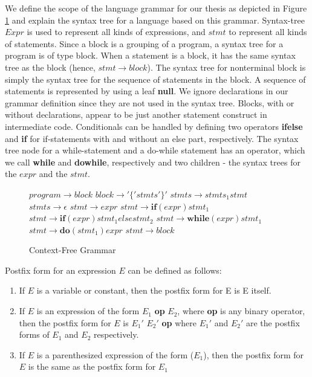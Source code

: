 We define the scope of the language grammar for our thesis as depicted in Figure \ref{fig:grammardef} and explain the syntax tree for a language based on this grammar. Syntax-tree $Expr$ is used to represent all kinds of expressions, and $stmt$ to represent all kinds of statements. Since a block is a grouping of a program, a syntax tree for a program is of type block. When a statement is a block, it has the same syntax tree as the block (hence, $stmt \to block$). The syntax tree for nonterminal block is simply the syntax tree for the sequence of statements in the block. A sequence of statements is represented by using a leaf \textbf{null}. We ignore declarations in our grammar definition since they are not used in the syntax tree. Blocks, with or without declarations, appear to be just another statement construct in intermediate code. Conditionals can be handled by defining two operators \textbf{ifelse} and \textbf{if} for if-statements with and without an else part, respectively. The syntax tree node for a while-statement and a do-while statement has an operator, which we call \textbf{while} and \textbf{dowhile}, respectively and two children - the syntax trees for the $expr$ and the $stmt$. 

\begin{figure}[here]
\begin{algorithmic}
\State $ program \to block$
\State $ block \to '\{' stmts '\}'$
\State $ stmts \to stmts_{1} stmt $
\State $ stmts \to \epsilon$
\State $ stmt \to expr $
\State $ stmt \to \textbf{if} (expr) stmt_{1}$
\State $ stmt \to \textbf{if} (expr) stmt_{1} else stmt_{2} $
\State $ stmt \to \textbf{while} (expr) stmt_{1}$
\State $ stmt \to \textbf{do} (stmt_{1}) expr $
\State $ stmt \to block $
\end{algorithmic}
\caption{Context-Free Grammar}
\label{fig:grammardef}
\end{figure}

\begin{definition}
Postfix form for an expression $E$ can be defined as follows:
\begin{enumerate}
\item If $E$ is a variable or constant, then the postfix form for E is E itself. 
\item If $E$ is an expression of the form $E_{1}$ \textbf{op} $E_{2}$, where \textbf{op} is any binary operator, then the postfix form for $E$ is $E_{1}'$ $E_{2}'$ \textbf{op} where $E_{1}'$ and $E_{2}'$ are the postfix forms of $E_{1}$ and $E_{2}$ respectively. 
\item If $E$ is a parenthesized expression of the form ($E_{1}$), then the postfix form for $E$ is the same as the postfix form for $E_{1}$
\end{enumerate}
\label{def:postfix}
\end{definition}

